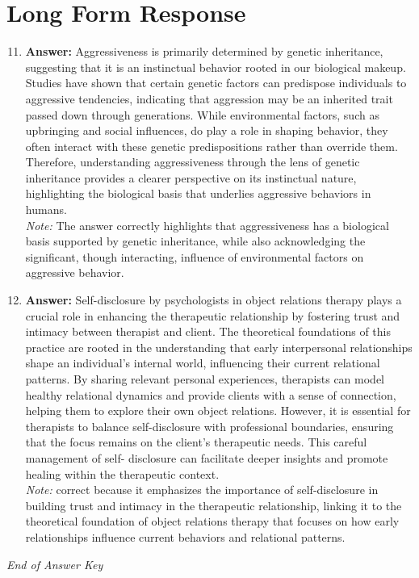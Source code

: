 \documentclass[12pt]{article}
\begin{document}
\section*{Long Form Response}
\begin{enumerate}[label=\arabic*.]
\setcounter{enumi}{10}
\item \textbf{Answer:} Aggressiveness is primarily determined by genetic inheritance, suggesting that it is an instinctual behavior rooted in our biological makeup. Studies have shown that certain genetic factors can predispose individuals to aggressive tendencies, indicating that aggression may be an inherited trait passed down through generations. While environmental factors, such as upbringing and social influences, do play a role in shaping behavior, they often interact with these genetic predispositions rather than override them. Therefore, understanding aggressiveness through the lens of genetic inheritance provides a clearer perspective on its instinctual nature, highlighting the biological basis that underlies aggressive behaviors in humans.
\\ \textit{Note:} The answer correctly highlights that aggressiveness has a biological basis supported by genetic inheritance, while also acknowledging the significant, though interacting, influence of environmental factors on aggressive behavior.
\item \textbf{Answer:} Self-disclosure by psychologists in object relations therapy plays a crucial role in enhancing the therapeutic relationship by fostering trust and intimacy between therapist and client. The theoretical foundations of this practice are rooted in the understanding that early interpersonal relationships shape an individual's internal world, influencing their current relational patterns. By sharing relevant personal experiences, therapists can model healthy relational dynamics and provide clients with a sense of connection, helping them to explore their own object relations. However, it is essential for therapists to balance self-disclosure with professional boundaries, ensuring that the focus remains on the client's therapeutic needs. This careful management of self- disclosure can facilitate deeper insights and promote healing within the therapeutic context.
\\ \textit{Note:} correct because it emphasizes the importance of self-disclosure in building trust and intimacy in the therapeutic relationship, linking it to the theoretical foundation of object relations therapy that focuses on how early relationships influence current behaviors and relational patterns.
\end{enumerate}

\vfill
\noindent\textit{End of Answer Key}
\end{document}
